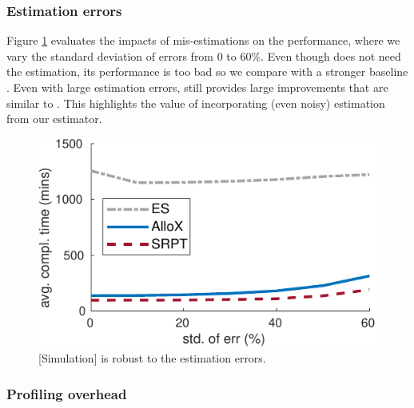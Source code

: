 \subsubsection{Estimation errors}
\label{sec:estimation_err}

Figure \ref{fig:analysis_err} evaluates the impacts of mis-estimations on the performance, where we vary the standard deviation of errors from 0 to 60\%.
Even though \DRFFIFO does not need the estimation, its performance is too bad so we compare \name with a stronger baseline \ESRP. %
Even with large estimation errors, \name still provides large improvements that are similar to \SRPT. 
This highlights the value of incorporating (even noisy) estimation from our estimator. 

\begin{figure}[h]
	\centering
	\includegraphics[width=0.9\linewidth]{figs/analysis_err}
	\caption{[Simulation]  \name is robust to the estimation errors.}%
	\label{fig:analysis_err}
\end{figure}

\subsubsection{Profiling overhead}
\label{sec:overhead}

